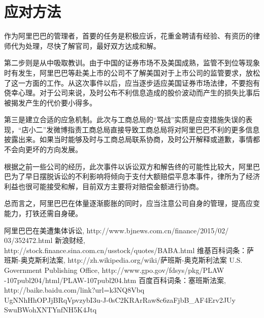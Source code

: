\documentclass[UTF8]{ctexart}
\begin{document}
\section{应对方法}
作为阿里巴巴的管理者，首要的任务是积极应诉，花重金聘请有经验、有资历的律师代为处理，尽快了解官司，最好双方达成和解。\par
第二步则是从中吸取教训。由于中国的证券市场不及美国成熟，监管不到位等现象时有发生，阿里巴巴等赴美上市的公司不了解美国对于上市公司的监管要求，放松了这一方面的工作。从这次事件以后，应当逐步适应美国证券市场法律，不要抱有侥幸心理。对于公司来说，及时公布不利信息造成的股价波动而产生的损失比事后被揭发产生的代价要小得多。\par
第三是建立合适的应急机制。此次与工商总局的“骂战”实质是应变措施失误的表现，“店小二”发微博指责工商总局直接导致工商总局将对阿里巴巴不利的更多信息披露出来。如果当时能够及时与工商总局联系协商，及时公开解释或道歉，事情都不会向更坏的方向发展。\par
根据之前一些公司的经历，此次事件以诉讼双方和解告终的可能性比较大，阿里巴巴为了早日摆脱诉讼的不利影响将倾向于支付大额赔偿平息本事件，律所为了经济利益也很可能接受和解，目前双方主要将对赔偿金额进行协商。\par
总而言之，阿里巴巴在体量逐渐膨胀的同时，应当注意公司自身的管理，提高应变能力，打铁还需自身硬。
\begin{thebibliography}{}

阿里巴巴在美遭集体诉讼, http://www.bjnews.com.cn/finance/2015/02/\\03/352472.html
新浪财经, http://stock.finance.sina.com.cn/usstock/quotes/BABA.html
维基百科词条：萨班斯-奥克斯利法案, http://zh.wikipedia.org/wiki/萨班斯-奥克斯利法案
U.S. Government Publishing Office, http://www.gpo.gov/fdsys/pkg/PLAW\\-107publ204/html/PLAW-107publ204.htm
百度百科词条：塞班斯法案, http://baike.baidu.com/link?url=k3NQ8Vbq\\UgNNhHhOPJjBRqVpvzybI3u-J-0sC2KRArRaw8c6zaFjbB\_AF4Erv2JUy\\SwuBWohXNTYnfNH5K4Jtq

\end{thebibliography}
\end{document}

